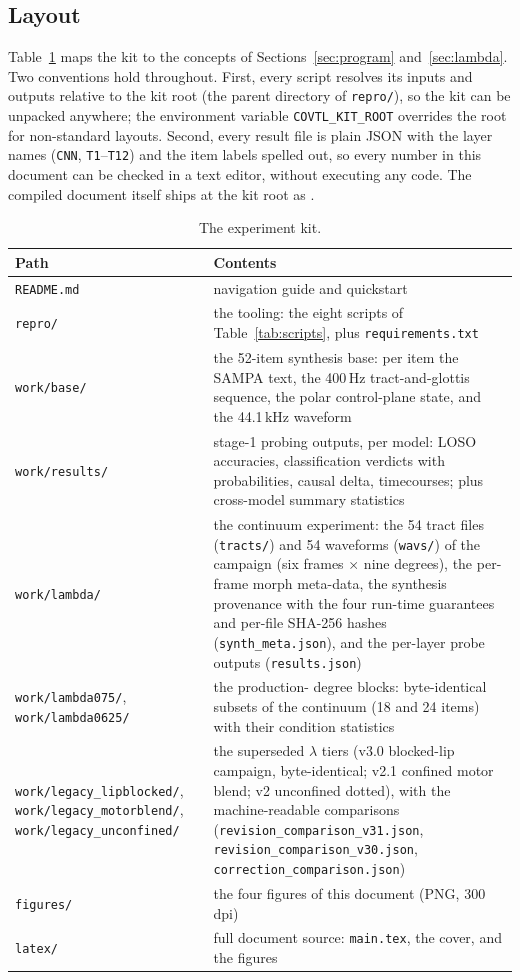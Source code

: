 \documentclass[11pt,a4paper]{article}
\newcommand{\sampa}[1]{\texttt{#1}}
\newcommand{\lam}{\lambda}
\begin{document}
\subsection{Layout}

Table~\ref{tab:kit} maps the kit to the concepts of
Sections~\ref{sec:program} and~\ref{sec:lambda}. Two conventions hold
throughout. First, every script resolves its inputs and outputs
relative to the kit root (the parent directory of \sampa{repro/}), so
the kit can be unpacked anywhere; the environment variable
\sampa{COVTL\_KIT\_ROOT} overrides the root for non-standard layouts.
Second, every result file is plain JSON with the layer names
(\sampa{CNN}, \sampa{T1}--\sampa{T12}) and the item labels spelled
out, so every number in this document can be checked in a text editor,
without executing any code. The compiled document itself ships at
the kit root as .

\begin{table}[htbp]
\centering
\small
\caption{The experiment kit.}
\label{tab:kit}
\begin{tabularx}{\textwidth}{@{}l X@{}}
\toprule
Path & Contents \\
\midrule
\sampa{README.md} & navigation guide and quickstart \\
\sampa{repro/} & the tooling: the eight scripts of
Table~\ref{tab:scripts}, plus \sampa{requirements.txt} \\
\sampa{work/base/} & the 52-item synthesis base: per item the SAMPA
text, the 400\,Hz tract-and-glottis sequence, the polar control-plane
state, and the 44.1\,kHz waveform \\
\sampa{work/results/} & stage-1 probing outputs, per model: LOSO
accuracies, classification verdicts with probabilities, causal delta,
timecourses; plus cross-model summary statistics \\
\sampa{work/lambda/} & the continuum experiment: the 54 tract files
(\sampa{tracts/}) and 54 waveforms (\sampa{wavs/}) of the campaign
(six frames $\times$ nine degrees), the per-frame morph meta-data, the
synthesis provenance with the four run-time guarantees and per-file
SHA-256 hashes (\sampa{synth\_meta.json}), and the per-layer probe
outputs (\sampa{results.json}) \\
\sampa{work/lambda075/}, \sampa{work/lambda0625/} & the production-
degree blocks: byte-identical subsets of the continuum (18 and 24
items) with their condition statistics \\
\sampa{work/legacy\_lipblocked/},
\sampa{work/legacy\_motorblend/}, \sampa{work/legacy\_unconfined/} &
the superseded $\lam$ tiers (v3.0 blocked-lip campaign, byte-identical;
v2.1 confined motor blend; v2 unconfined dotted), with the
machine-readable comparisons
(\sampa{revision\_comparison\_v31.json},
\sampa{revision\_comparison\_v30.json},
\sampa{correction\_comparison.json}) \\
\sampa{figures/} & the four figures of this document (PNG, 300\,dpi) \\
\sampa{latex/} & full document source: \sampa{main.tex}, the cover,
and the figures \\
\bottomrule
\end{tabularx}
\end{table}
\end{document}
